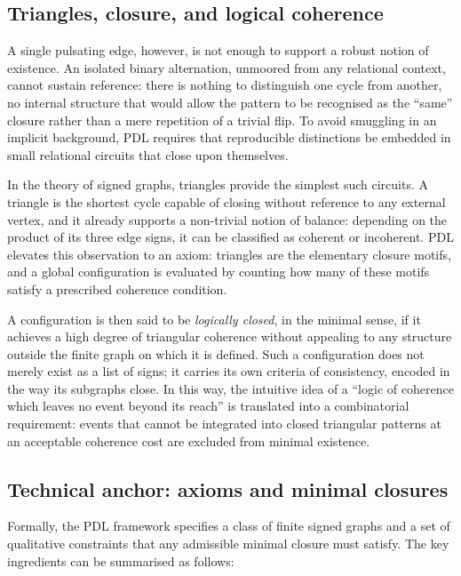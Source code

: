 \documentclass[11pt,a4paper]{article}
\theoremstyle{definition}
\begin{document}
\subsection{Triangles, closure, and logical coherence}

A single pulsating edge, however, is not enough to support a robust notion of existence. An isolated binary alternation, unmoored from any relational context, cannot sustain reference: there is nothing to distinguish one cycle from another, no internal structure that would allow the pattern to be recognised as the ``same'' closure rather than a mere repetition of a trivial flip.\cite{Laubscher_Existence_PulsatingClosure_2026} To avoid smuggling in an implicit background, PDL requires that reproducible distinctions be embedded in small relational circuits that close upon themselves.

In the theory of signed graphs, triangles provide the simplest such circuits. A triangle is the shortest cycle capable of closing without reference to any external vertex, and it already supports a non-trivial notion of balance: depending on the product of its three edge signs, it can be classified as coherent or incoherent.\cite{Laubscher_EmergencePhysicalReality_2024,Laubscher_Leakage_Probability_2024} PDL elevates this observation to an axiom: triangles are the elementary closure motifs, and a global configuration is evaluated by counting how many of these motifs satisfy a prescribed coherence condition.

A configuration is then said to be \emph{logically closed}, in the minimal sense, if it achieves a high degree of triangular coherence without appealing to any structure outside the finite graph on which it is defined.\cite{Laubscher_EmergencePhysicalReality_2024,Laubscher_MinimalClosures_46_2024} Such a configuration does not merely exist as a list of signs; it carries its own criteria of consistency, encoded in the way its subgraphs close. In this way, the intuitive idea of a ``logic of coherence which leaves no event beyond its reach'' is translated into a combinatorial requirement: events that cannot be integrated into closed triangular patterns at an acceptable coherence cost are excluded from minimal existence.

\subsection{Technical anchor: axioms and minimal closures}

Formally, the PDL framework specifies a class of finite signed graphs and a set of qualitative constraints that any admissible minimal closure must satisfy.\cite{Laubscher_IntroPDL_2024,Laubscher_EmergencePhysicalReality_2024,Laubscher_MinimalClosures_46_2024,Laubscher_PDL_Position_2024} The key ingredients can be summarised as follows:
\end{document}
